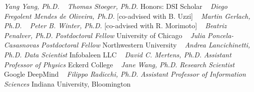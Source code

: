 \GapNoBreak
{}
\textit{Yang Yang, Ph.D.}
\newline
~
\Gap{}
\textit{Thomas Stoeger, Ph.D.}
\newline
    {\footnotesize Honors: DSI Scholar}
    \newline
~
\Gap{}
\textit{Diego Fregolent Mendes de Oliveira, Ph.D.}
    [co-advised with B. Uzzi]
\newline
~
\Gap{}
\textit{Martin Gerlach, Ph.D.}
\newline
~
\Gap{}
\textit{Peter B. Winter, Ph.D.}
    [co-advised with R. Morimoto]
\newline
~
\Gap{}
\textit{Beatriz Penalver, Ph.D.}
\newline
    \textit{Postdoctoral Fellow}
    \newline
    University of Chicago
    \newline
~
\Gap{}
\textit{Julia Poncela-Casasnovas}
\newline
    \textit{Postdoctoral Fellow}
    \newline
    Northwestern University
    \newline
~
\Gap{}
\textit{Andrea Lancichinetti, Ph.D.}
\newline
    \textit{Data Scientist}
    \newline
    Infobaleen LLC
    \newline
~
\Gap{}
\textit{David C. Mertens, Ph.D.}
\newline
    \textit{Assistant Professor of Physics}
    \newline
    Eckerd College
    \newline
~
\Gap{}
\textit{Jane Wang, Ph.D.}
\newline
    \textit{Research Scientist}
    \newline
    Google DeepMind
    \newline
~
\Gap{}
\textit{Filippo Radicchi, Ph.D.}
\newline
    \textit{Assistant Professor of Information Sciences}
    \newline
    Indiana University, Bloomington
